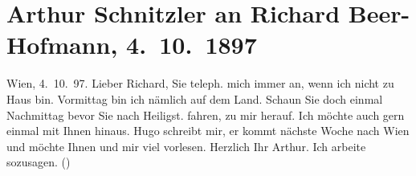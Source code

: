 

         
         \renewcommand{\erwaehntePersonen}{Personen: Richard Beer-Hofmann, Hugo von Hofmannsthal}
         \renewcommand{\erwaehnteOrte}{Orte: Heiligenstadt, Wien, Wollzeile}
         \renewcommand{\erwaehnteWerke}{}
               \section[Arthur Schnitzler an Richard Beer-Hofmann, 4. 10. 1897]{ Arthur Schnitzler an Richard Beer-Hofmann, 4. 10. 1897}\nopagebreak{}\rehead{ }\begin{ledgroupsized}[t]{13cm}\normalsize\beginnumbering \toendnotes[C]{\smallbreak\pagebreak[2]} 
\toendnotes[C]{\smallbreak}\pstart
           \raggedleft{}{\pb}Wien, 4. 10. 97.\pend
           \pstart
           Lieber Richard, Sie teleph. mich immer an, wenn ich nicht zu Haus
               bin. Vormittag bin ich nämlich auf dem Land. Schaun Sie doch einmal Nachmittag bevor
               Sie nach Heiligst. fahren, zu mir herauf. Ich
               möchte auch gern einmal mit Ihnen hinaus. Hugo
               schreibt mir, er kommt nächste Woche nach Wien und
               möchte Ihnen und mir viel vorlesen.\pend
           \pstart
           Herzlich Ihr \spacefill\mbox{Arthur.}\pend
           \pstart
           \noindent{}Ich arbeite sozusagen.\pend
           \pstart
           (\label{T_L00729-1v}\label{T_L00729-1h})\pend
           
         
         \endnumbering{}\end{ledgroupsized}  \newcommand{\dateiname}{L00729}\newcommand{\titel}{Arthur Schnitzler an Richard Beer-Hofmann, 4. 10. 1897}\newcommand{\editorInnen}{Martin Anton Müller und Gerd-Hermann Susen}
      